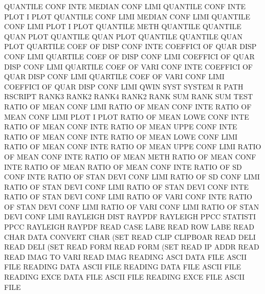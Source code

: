 QUANTILE CONF INTE                      MEDIAN   CONF LIMI
QUANTILE CONF INTE PLOT                 I        PLOT
QUANTILE CONF LIMI                      MEDIAN   CONF LIMI
QUANTILE CONF LIMI PLOT                 I        PLOT
QUANTILE METH                           QUANTILE
QUANTILE QUAN PLOT                      QUANTILE QUAN PLOT
QUANTILE                                QUANTILE QUAN PLOT
QUARTILE COEF OF   DISP CONF INTE       COEFFICI OF   QUAR DISP CONF LIMI
QUARTILE COEF OF   DISP CONF LIMI       COEFFICI OF   QUAR DISP CONF LIMI
QUARTILE COEF OF   VARI CONF INTE       COEFFICI OF   QUAR DISP CONF LIMI
QUARTILE COEF OF   VARI CONF LIMI       COEFFICI OF   QUAR DISP CONF LIMI
QWIN     SYST                           SYSTEM
R        PATH                           RSCRIPT
RANK3                                   RANK2
RANK4                                   RANK2
RANK     SUM                            RANK     SUM  TEST
RATIO    OF   MEAN CONF LIMI            RATIO    OF   MEAN CONF INTE
RATIO    OF   MEAN CONF LIMI PLOT       I        PLOT
RATIO    OF   MEAN LOWE CONF INTE       RATIO    OF   MEAN CONF INTE
RATIO    OF   MEAN UPPE CONF INTE       RATIO    OF   MEAN CONF INTE
RATIO    OF   MEAN LOWE CONF LIMI       RATIO    OF   MEAN CONF INTE
RATIO    OF   MEAN UPPE CONF LIMI       RATIO    OF   MEAN CONF INTE
RATIO    OF   MEAN METH                 RATIO    OF   MEAN CONF INTE
RATIO    OF   MEAN                      RATIO    OF   MEAN CONF INTE
RATIO    OF   SD   CONF INTE            RATIO    OF   STAN DEVI CONF LIMI
RATIO    OF   SD   CONF LIMI            RATIO    OF   STAN DEVI CONF LIMI
RATIO    OF   STAN DEVI CONF INTE       RATIO    OF   STAN DEVI CONF LIMI
RATIO    OF   VARI CONF INTE            RATIO    OF   STAN DEVI CONF LIMI
RATIO    OF   VARI CONF LIMI            RATIO    OF   STAN DEVI CONF LIMI
RAYLEIGH DIST                           RAYPDF
RAYLEIGH PPCC                           STATISTI PPCC
RAYLEIGH                                RAYPDF
READ     CASE LABE                      READ     ROW  LABE
READ     CHAR DATA                      CONVERT  CHAR (SET
READ     CLIP                           CLIPBOAR
READ     DELI                           READ     DELI (SET
READ     FORM                           READ     FORM (SET
READ     IP   ADDR                      READ
READ     IMAG TO   VARI                 READ     IMAG
READING  ASCI DATA FILE                 ASCII    FILE
READING  DATA                           ASCII    FILE
READING  DATA FILE                      ASCII    FILE
READING  EXCE DATA FILE                 ASCII    FILE
READING  EXCE FILE                      ASCII    FILE
